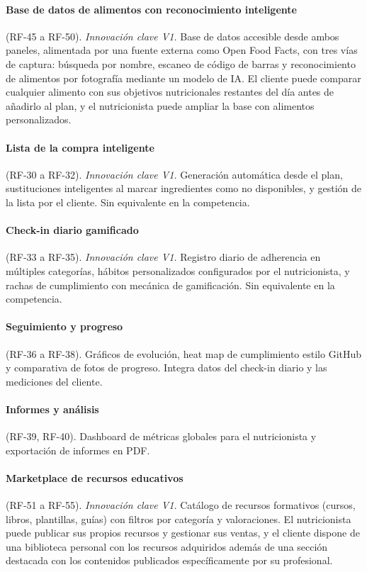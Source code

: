 \paragraph{Base de datos de alimentos con reconocimiento inteligente} (RF-45 a RF-50). \textit{Innovación clave V1.} Base de datos accesible desde ambos paneles, alimentada por una fuente externa como Open Food Facts, con tres vías de captura: búsqueda por nombre, escaneo de código de barras y reconocimiento de alimentos por fotografía mediante un modelo de IA. El cliente puede comparar cualquier alimento con sus objetivos nutricionales restantes del día antes de añadirlo al plan, y el nutricionista puede ampliar la base con alimentos personalizados.

\paragraph{Lista de la compra inteligente} (RF-30 a RF-32). \textit{Innovación clave V1.} Generación automática desde el plan, sustituciones inteligentes al marcar ingredientes como no disponibles, y gestión de la lista por el cliente. Sin equivalente en la competencia.

\paragraph{Check-in diario gamificado} (RF-33 a RF-35). \textit{Innovación clave V1.} Registro diario de adherencia en múltiples categorías, hábitos personalizados configurados por el nutricionista, y rachas de cumplimiento con mecánica de gamificación. Sin equivalente en la competencia.

\paragraph{Seguimiento y progreso} (RF-36 a RF-38). Gráficos de evolución, heat map de cumplimiento estilo GitHub y comparativa de fotos de progreso. Integra datos del check-in diario y las mediciones del cliente.

\paragraph{Informes y análisis} (RF-39, RF-40). Dashboard de métricas globales para el nutricionista y exportación de informes en PDF.

\paragraph{Marketplace de recursos educativos} (RF-51 a RF-55). \textit{Innovación clave V1.} Catálogo de recursos formativos (cursos, libros, plantillas, guías) con filtros por categoría y valoraciones. El nutricionista puede publicar sus propios recursos y gestionar sus ventas, y el cliente dispone de una biblioteca personal con los recursos adquiridos además de una sección destacada con los contenidos publicados específicamente por su profesional.

